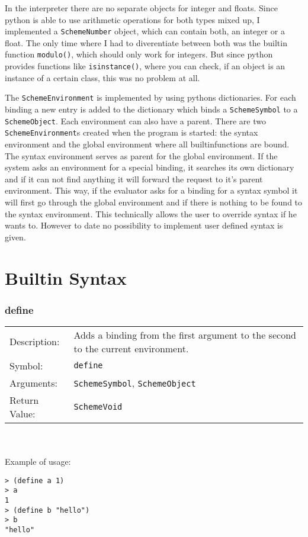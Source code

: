 \documentclass[12pt,a4paper]{scrartcl}
\begin{document}
In the interpreter there are no separate objects for integer and floats. Since python is able to use arithmetic operations for both types mixed up, I implemented a \lstinline{SchemeNumber} object, which can contain both, an integer or a float. The only time where I had to diverentiate between both was the builtin function \lstinline{modulo()}, which should only work for integers. But since python provides functions like \lstinline{isinstance()}, where you can check, if an object is an instance of a certain class, this was no problem at all.

The \lstinline{SchemeEnvironment} is implemented by using pythons dictionaries. For each binding a new entry is added to the dictionary which binds a \lstinline{SchemeSymbol} to a \lstinline{SchemeObject}. Each environment can also have a parent. There are two \lstinline{SchemeEnvironment}s created when the program is started: the syntax environment and the global environment where all builtinfunctions are bound. The syntax environment serves as parent for the global environment. If the system asks an environment for a special binding, it searches its own dictionary and if it can not find anything it will forward the request to it's parent environment. This way, if the evaluator asks for a binding for a syntax symbol it will first go through the global environment and if there is nothing to be found to the syntax environment. This technically allows the user to override syntax if he wants to. However to date no possibility to implement user defined syntax is given. 



\section*{Builtin Syntax}

\subsubsection*{define}
\begin{tabular}{l  p{13cm}}
Description: & Adds a binding from the first argument to the second to the current environment.\\
Symbol: & \lstinline{define}\\
Arguments: & \lstinline{SchemeSymbol}, \lstinline{SchemeObject}\\
Return Value: & \lstinline{SchemeVoid}\\
\end{tabular}
\\
\\
Example of usage:
\begin{lstlisting}
> (define a 1)
> a
1
> (define b "hello")
> b
"hello"
\end{lstlisting}
\end{document}
